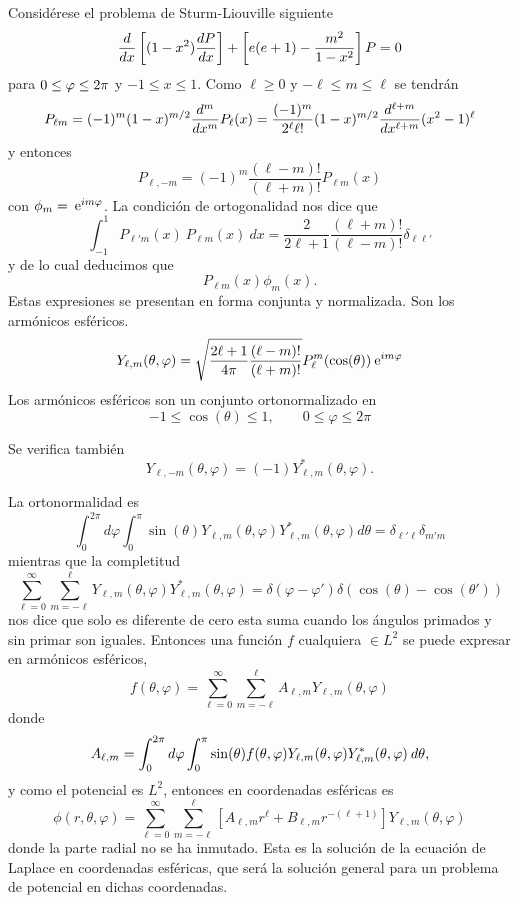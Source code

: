 \documentclass[10pt,oneside]{CBFT_book}
\begin{document}
Considérese el problema de Sturm-Liouville siguiente
\[
	\dtot{}{x} \left[ (1-x^2) \dtot{P}{x} \right] + \left[ e(e+1) - \frac{m^2}{1-x^2} \right] P = 0
\]
para $ 0 \leq \vp \leq 2\pi$ y $-1 \leq x \leq 1$. Como $ \ell \geq 0$ y $ -\ell \leq m \leq \ell$
se tendrán 
\[
	P_{\ell m} = (-1)^m (1-x)^{m/2} \dtot[m]{}{x} P_\ell(x) =
	\frac{(-1)^m}{2^\ell \ell!} (1-x)^{m/2} \dtot[{\ell+m}]{}{x} (x^2-1)^\ell
\]
y entonces
\[
	P_{\ell, -m} = (-1)^m \frac{(\ell -m)!}{(\ell + m)!} P_{\ell m}(x)
\]
con $\phi_m = \euler^{im\vp}$.
La condición de ortogonalidad nos dice que
\[
	\int_{-1}^1  P_{\ell' m}(x) \: P_{\ell m}(x) \: dx = 
	\frac{2}{2\ell +1} \frac{(\ell + m)!}{(\ell - m)!} \delta_{\ell\ell'}
\]
y de lo cual deducimos que 
\[
	 P_{\ell m}(x)\phi_m(x).
\]
Estas expresiones se presentan en forma conjunta y normalizada. Son los armónicos
esféricos.
\[
	Y_{\ell,m}(\theta,\varphi) = \sqrt{ \frac{ 2\ell + 1}{4\pi} \frac{(\ell-m)! }{(\ell+ m)! } }
	P_\ell^m(\cos(\theta)) \euler^{i m \varphi}
\]
Los armónicos esféricos son un conjunto ortonormalizado en 
\[
	- 1 \leq \cos(\theta) \leq 1 , \qquad 0 \leq \varphi \leq 2\pi
\]

Se verifica también
\[
	Y_{\ell,-m}(\theta,\varphi) = (-1) Y_{\ell,m}^*(\theta,\varphi).
\]

La ortonormalidad es
\[
	\int_0^{2\pi} d\varphi \int_0^\pi \sin(\theta) 
	Y_{\ell,m}(\theta,\varphi) Y_{\ell,m}^*(\theta,\varphi) d\theta 
	= \delta_{\ell'\ell}\delta_{m'm}
\]
mientras que la completitud
\[
	\sum_{\ell=0}^\infty \sum_{m=-\ell}^\ell Y_{\ell,m}(\theta,\varphi) Y_{\ell,m}^*(\theta,\varphi) = 
	\delta(\varphi 	-\varphi') \delta(\cos(\theta)-\cos(\theta'))
\]
nos dice que solo es diferente de cero esta suma cuando los ángulos primados y 
sin primar son iguales.
Entonces una función $f$ cualquiera $\in L^2$ se puede expresar en armónicos esféricos,
\[
	f(\theta,\varphi) = \sum_{\ell=0}^\infty \sum_{m=-\ell}^\ell A_{\ell,m} Y_{\ell,m}(\theta,\varphi)
\]
donde 
\[
	A_{\ell,m} = 	\int_0^{2\pi} d\varphi \int_0^\pi \sin(\theta) f(\theta,\vp)
	Y_{\ell,m}(\theta,\varphi) Y_{\ell,m}^*(\theta,\varphi) \: d\theta, 
\]
y como el potencial es $L^2$, entonces en coordenadas esféricas es
\[
	\phi(r,\theta,\varphi) = 
	\sum_{\ell=0}^\infty \sum_{m=-\ell}^\ell 
	[A_{\ell,m}r^\ell + B_{\ell,m} r^{-(\ell+1)}] Y_{\ell,m}(\theta,\varphi)
\]
donde la parte radial no se ha inmutado. Esta es la solución de la ecuación de Laplace en coordenadas
esféricas, que será la solución general para un problema de potencial en dichas coordenadas.
\end{document}
